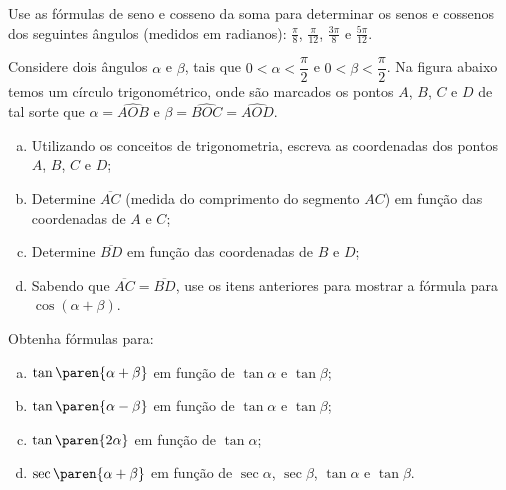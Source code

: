\begin{exercise}
    Use as fórmulas de seno e cosseno da soma para determinar os
senos e cossenos dos seguintes ângulos (medidos em radianos): $\frac
{\pi} 8$, $\frac{\pi} {12}$, $\frac {3\pi} 8$ e $\frac{5\pi}{12}$.
\end{exercise}

\begin{exercise}
  Considere dois ângulos $\alpha$ e $\beta$, tais que $0 < \alpha < \dfrac \pi 2$ e $0 < \beta < \dfrac \pi 2$. Na figura abaixo temos um círculo trigonométrico, onde são marcados os pontos $A$, $B$, $C$ e $D$ de tal sorte que $\alpha = \widehat{AOB}$ e $\beta = \widehat{BOC} = \widehat{AOD}$.
  \begin{center}
    \label{fig:cos-da-soma}
  \end{center}
  \begin{enumerate}[a)]
    \item Utilizando os conceitos de trigonometria, escreva as coordenadas dos pontos $A$, $B$, $C$ e $D$;
    \item Determine $\overline{AC}$ (medida do comprimento do segmento $AC$) em função das coordenadas de $A$ e $C$;
    \item Determine $\overline{BD}$ em função das coordenadas de $B$ e $D$;
    \item Sabendo que $\overline{AC} = \overline{BD}$, use os itens anteriores para mostrar a fórmula para $\cos (\alpha + \beta)$.
    \end{enumerate}
\end{exercise}

\begin{exercise}
    Obtenha fórmulas para: 
    \begin{enumerate}[a)]
      \item $\tan\paren{\alpha + \beta}$ em função de $\tan \alpha$ e $\tan \beta$;
      \item $\tan\paren{\alpha - \beta}$ em função de $\tan \alpha$ e $\tan \beta$;
      \item $\tan\paren{2 \alpha}$ em função de $\tan \alpha$;
      \item $\sec \paren{\alpha + \beta}$ em função de $\sec \alpha$, $\sec \beta$, $\tan \alpha$ e $\tan \beta$.
    \end{enumerate}
\end{exercise}

